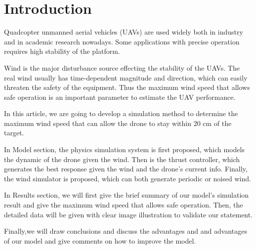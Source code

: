 \section{Introduction}
Quadcopter unmanned aerial vehicles (UAVs) are used widely both in industry and in academic research nowadays. Some applications with precise operation requires high stability of the platform.

Wind is the major disturbance source effecting the stability of the UAVs. The real wind usually has time-dependent magnitude and direction, which can easily threaten the safety of the equipment. Thus the maximum wind speed that allows safe operation is an important parameter to estimate the UAV performance.

In this article, we are going to develop a simulation method to determine the maximum wind speed that can allow the drone to stay within $20$ cm of the target. 

In Model section, the physics simulation system is first proposed, which models the dynamic of the drone given the wind. Then is the thrust controller, which generates the best response given the wind and the drone's current info. Finally, the wind simulator is  proposed, which can both generate periodic or noised wind. 


In Results section, we will first give the brief summary of our model's simulation result and give the maximum wind speed that allows safe operation. Then, the detailed data will be given with clear image illustration to validate our statement.

Finally,we will draw conclusions and discuss the advantages and  and advantages of our model and give comments on how to improve the model.
 



